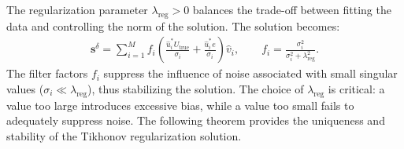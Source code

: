 \documentclass{article}
\theoremstyle{plain}
\theoremstyle{definition}
\begin{document}
The regularization parameter $\lambda_{\text{reg}} > 0$ balances the trade-off between fitting the data and controlling the norm of the solution. The solution becomes: 
\begin{align}\label{T-SVD}
\boldsymbol{s}^{\delta}=\sum_{i=1}^M f_i \left(\frac{\hat{u}_i^* U_{\text{true}}}{\sigma_i}+\frac{\hat{u}_i^* e}{\sigma_i}\right)\hat{v}_i,  \quad  \quad f_i = \frac{\sigma_i^2}{\sigma_i^2+\lambda_{\text{reg}}^2}.
\end{align}
The filter factors $f_i$ suppress the influence of noise associated with small singular values ($\sigma_i \ll \lambda_{\text{reg}}$),  thus stabilizing the solution. The choice of $\lambda_{\text{reg}}$ is critical: a value too large introduces excessive bias,  while a value too small fails to adequately suppress noise. The following theorem provides the uniqueness and stability of the Tikhonov regularization solution.
\end{document}
